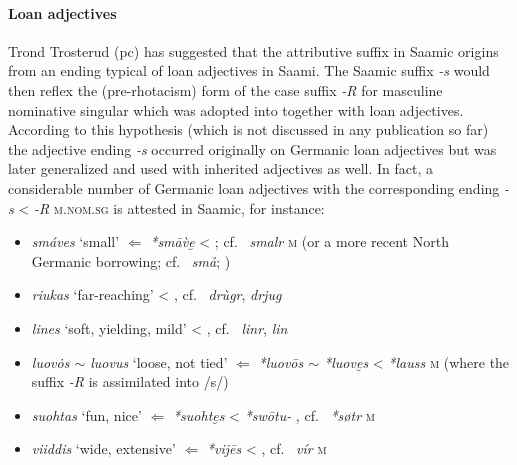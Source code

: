 {\paragraph{Loan adjectives} 
Trond Trosterud (pc) has suggested that the attributive suffix in Saamic origins from an ending typical of  loan adjectives in Saami. The Saamic suffix \textit{-s} would then reflex the (pre-rhotacism) form of the  case suffix \textit{-R} for masculine nominative singular which was adopted into  together with loan adjectives. According to this hypothesis (which is not discussed in any publication so far) the adjective ending \mbox{\textit{-s}} occurred originally on Germanic loan adjectives but was later generalized and used with inherited adjectives as well. In fact, a considerable number of Germanic loan adjectives with the corresponding ending \textit{-s} <  \textit{-R} \textsc{m.nom.sg} is attested in Saamic, for instance:
\begin{itemize}
\item {} \textit{smáves} ‘small’ $\Leftarrow$  \textit{*smāv̀e̮} < ; cf.~ \textit{smalr} \textsc{m} (or a more recent North Germanic borrowing; cf.~ \textit{sm\aa}; \citealt[263]{sammallahti1998b})
\item {} \textit{riukas} ‘far-reaching’ < , cf.~ \textit{drùgr},  \textit{drjug} \cite[267]{qvigstad1893}
\item {} \textit{lines} ‘soft, yielding, mild’ < , cf.~ \textit{linr},  \textit{lin} \cite[218]{qvigstad1893}
\item {} \textit{luov\.{o}s $\sim$ luovus} ‘loose, not tied’ $\Leftarrow$  \textit{*luovōs $\sim$ *luove̮s} <  \textit{*lauss} \textsc{m} (where the suffix \textit{-R} is assimilated into /s/) \cite[264]{sammallahti1998b}
\item {} \textit{suohtas} ‘fun, nice’ $\Leftarrow$  \textit{*suohte̮s} <  \textit{*swōtu-} \cite[264]{sammallahti1998b}, cf.~ \textit{*søtr} \textsc{m} 
\item {} \textit{viiddis} ‘wide, extensive’ $\Leftarrow$  \textit{*vij{\dh}ēs} <  \cite[148–149]{lehtiranta1989}, cf.~ \textit{v\'i{\dh}r} \textsc{m}

\end{itemize}}
